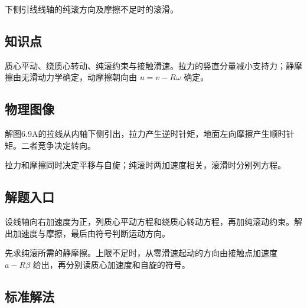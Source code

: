 \documentclass[UTF8,fontset=fandol,a4paper,11pt]{ctexart}
\begin{document}
下侧引线线轴的纯滚方向及摩擦不足时的滚滑。



\subsection*{知识点}

质心平动、绕质心转动、纯滚约束与接触滑速。拉力的竖直分量减小支持力；静摩擦由无滑动力学确定，动摩擦朝向由 $u=v-R\omega$ 确定。




\subsection*{物理图像}

解图6.9A的拉线从内轴下侧引出，拉力产生逆时针矩，地面左向摩擦产生顺时针矩。二者竞争决定转向。

拉力和摩擦同时决定平移与自旋；纯滚时两加速度相关，滚滑时分别列方程。



\subsection*{解题入口}

设线轴向右加速度为正，列质心平动方程和绕质心转动方程，再加纯滚动约束。解出加速度与摩擦，最后由符号判断运动方向。

先求纯滚所需的静摩擦。上限不足时，从零滑速起动的方向由接触点加速度 $a-R\beta$ 给出，再分别读质心加速度和自旋的符号。



\subsection*{标准解法}
\end{document}
